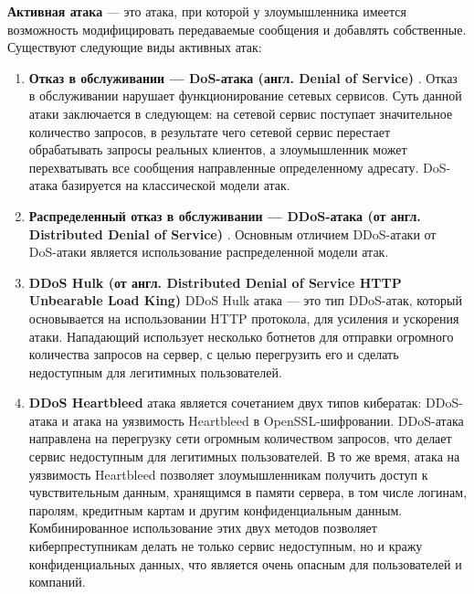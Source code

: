 



\textbf{Активная атака} \cite{six} --- это атака, при которой у злоумышленника имеется возможность модифицировать передаваемые сообщения и добавлять собственные. Существуют следующие виды активных атак:


\begin{enumerate}

    \item \textbf{Отказ в обслуживании --- DoS-атака (англ. Denial of Service)} \cite{fifth}. Отказ в обслуживании нарушает функционирование сетевых сервисов. Суть данной атаки заключается в следующем: на сетевой сервис поступает значительное количество запросов, в результате чего сетевой сервис перестает обрабатывать запросы реальных клиентов, а злоумышленник может перехватывать все сообщения направленные определенному адресату. DoS-атака базируется на классической модели атак. %
    \item \textbf{Распределенный отказ в обслуживании --- DDoS-атака (от англ. Distributed Denial of Service)} \cite{fifth}. Основным отличием DDoS-атаки от DoS-атаки является использование распределенной модели атак.
    \item \textbf{DDoS Hulk (от англ. Distributed Denial of Service HTTP Unbearable Load King)} DDoS Hulk атака --- это тип DDoS-атак, который основывается на использовании HTTP протокола, для усиления и ускорения атаки. Нападающий использует несколько ботнетов для отправки огромного количества запросов на сервер, с целью перегрузить его и сделать недоступным для легитимных пользователей.
    \item \textbf{DDoS Heartbleed} атака является сочетанием двух типов кибератак: DDoS-атака и атака на уязвимость Heartbleed в OpenSSL-шифровании. DDoS-атака направлена на перегрузку сети огромным количеством запросов, что делает сервис недоступным для легитимных пользователей. В то же время, атака на уязвимость Heartbleed позволяет злоумышленникам получить доступ к чувствительным данным, хранящимся в памяти сервера, в том числе логинам, паролям, кредитным картам и другим конфиденциальным данным. Комбинированное использование этих двух методов позволяет киберпреступникам делать не только сервис недоступным, но и кражу конфиденциальных данных, что является очень опасным для пользователей и компаний.

\end{enumerate}
